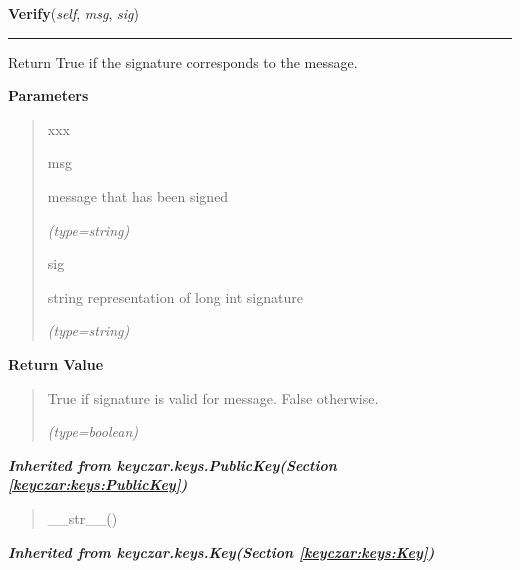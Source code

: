 \hspace{.8\funcindent}\begin{boxedminipage}{\funcwidth}

    \raggedright \textbf{Verify}(\textit{self}, \textit{msg}, \textit{sig})

    \vspace{-1.5ex}

    \rule{\textwidth}{0.5\fboxrule}
\setlength{\parskip}{2ex}
    Return True if the signature corresponds to the message.

\setlength{\parskip}{1ex}
      \textbf{Parameters}
      \vspace{-1ex}

      \begin{quote}
        \begin{Ventry}{xxx}

          \item[msg]

          message that has been signed

            {\it (type=string)}

          \item[sig]

          string representation of long int signature

            {\it (type=string)}

        \end{Ventry}

      \end{quote}

      \textbf{Return Value}
    \vspace{-1ex}

      \begin{quote}
      True if signature is valid for message. False otherwise.

      {\it (type=boolean)}

      \end{quote}

    \end{boxedminipage}


\large{\textbf{\textit{Inherited from keyczar.keys.PublicKey\textit{(Section \ref{keyczar:keys:PublicKey})}}}}

\begin{quote}
\_\_str\_\_()
\end{quote}

\large{\textbf{\textit{Inherited from keyczar.keys.Key\textit{(Section \ref{keyczar:keys:Key})}}}}

